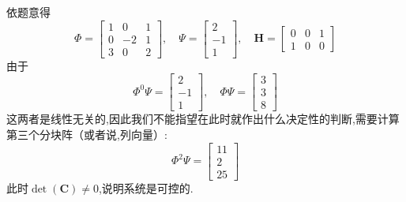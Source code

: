 \documentclass[cn,10pt,citestyle=gb7714-2015,bibstyle=gb7714-2015]{elegantbook}
\begin{document}
\begin{solution}
  依题意得
  \[
    \bm{\varPhi}=\begin{bmatrix}
      1&0&1\\
      0&-2&1\\
      3&0&2
    \end{bmatrix},\quad\bm{\varPsi}=\begin{bmatrix}
      2\\
      -1\\
      1
    \end{bmatrix},\quad\bm{H}=\begin{bmatrix}
      0&0&1\\
      1&0&0
    \end{bmatrix}
  \]
  由于
  \[
    \bm{\varPhi}^0\bm{\varPsi}=\begin{bmatrix}
      2\\
      -1\\
      1
    \end{bmatrix},\quad
    \bm{\varPhi}\bm{\varPsi}=\begin{bmatrix}
      3\\
      3\\
      8
    \end{bmatrix}
  \]
  这两者是线性无关的,因此我们不能指望在此时就作出什么决定性的判断,需要计算第三个分块阵（或者说,列向量）:
  \[
    \bm{\varPhi}^2\bm{\varPsi}=\begin{bmatrix}
      11\\
      2\\
      25
    \end{bmatrix}
  \]
  此时$\det(\bm{C})\neq 0$,说明系统是可控的.


\end{solution}
\end{document}
